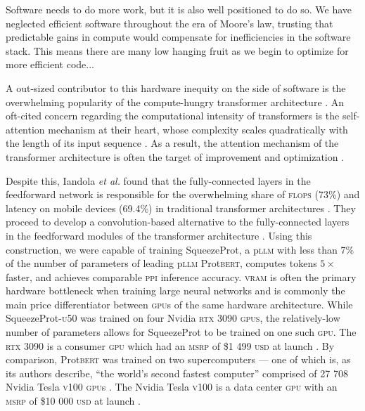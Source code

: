 \begin{displayquote}
\begin{singlespace}
Software needs to do more work, but it is also well positioned to do so. We have neglected efficient software throughout the era of Moore’s law, trusting that predictable gains in compute would compensate for inefficiencies in the software stack. This means there are many low hanging fruit as we begin to optimize for more efficient code... \cite{hardware_lottery}
\end{singlespace}
\end{displayquote}

A out-sized contributor to this hardware inequity on the side of software is the overwhelming popularity of the compute-hungry transformer architecture \cite{aiayn}. An oft-cited concern regarding the computational intensity of transformers is the self-attention mechanism at their heart, whose complexity scales quadratically with the length of its input sequence \cite{long_range_arena, Zimerman_Wolf_2023}. As a result, the attention mechanism of the transformer architecture is often the target of improvement and optimization \cite{longnet, flashattention, linformer, longformer}. 

Despite this, Iandola \textit{et al.} found that the fully-connected layers in the feedforward network is responsible for the overwhelming share of \textsc{flops} (73\%) and latency on mobile devices (69.4\%) in traditional transformer architectures \cite{squeezebert}. They proceed to develop a convolution-based alternative to the fully-connected layers in the feedforward modules of the transformer architecture \cite{squeezebert}. Using this construction, we were capable of training SqueezeProt, a p\textsc{llm} with less than 7\% of the number of parameters of  leading p\textsc{llm} Prot\textsc{bert}, computes tokens $5\times$ faster, and achieves comparable \textsc{ppi} inference accuracy. \textsc{vram} is often the primary hardware bottleneck when training large neural networks and is commonly the main price differentiator between \textsc{gpu}s of the same hardware architecture. While SqueezeProt-\textsc{u50} was trained on four Nvidia \textsc{rtx} 3090 \textsc{gpus}, the relatively-low number of parameters allows for SqueezeProt to be trained on one such \textsc{gpu}. The \textsc{rtx} 3090 is a consumer \textsc{gpu} which had an \textsc{msrp} of \$1 499 \textsc{usd} at launch \cite{rtx_3090_msrp}. By comparison, Prot\textsc{bert} was trained on two supercomputers --- one of which is, as its authors describe, ``the world’s second fastest computer'' comprised of 27 708 Nvidia Tesla \textsc{v100} \textsc{gpu}s \cite{elnaggar_prottrans_2022}. The Nvidia Tesla \textsc{v100} is a data center \textsc{gpu} with an \textsc{msrp} of \$10 000 \textsc{usd} at launch \cite{Keefer_2025}.

